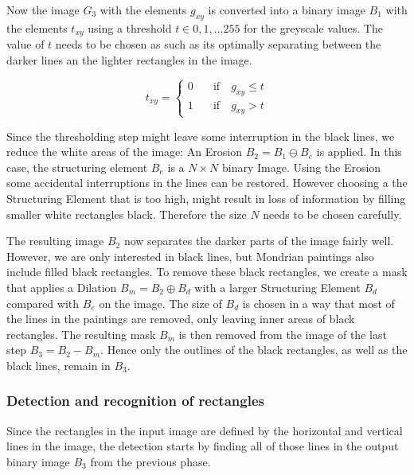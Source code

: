 Now the image $G_3$ with the elements $g_{xy}$ is converted into a binary image
$B_1$ with the elements $t_{xy}$ using a threshold $t \in 0,1,\dots255$ for the
greyscale values. The value of $t$ needs to be chosen as such as its optimally
separating between the darker lines an the lighter rectangles in the image.

\begin{equation}
  t_{xy} =
  \begin{cases}
    0 & \quad  \text{if}  \quad g_{xy} \leq t\\
    1  & \quad \text{if}  \quad g_{xy} > t
  \end{cases}
\end{equation}

Since the thresholding step might leave some interruption in the black lines, we
reduce the white areas of the image: An Erosion $B_2 = B_1 \ominus B_e$ is
applied. In this case, the structuring element $B_e$ is a $N\times N$ binary
Image. Using the Erosion some accidental interruptions in the lines can be
restored. However choosing a the Structuring Element that is too high, might
result in loss of information by filling smaller white rectangles black.
Therefore the size $N$ needs to be chosen carefully.

The resulting image $B_2$ now separates the darker parts of the image fairly
well. However, we are only interested in black lines, but Mondrian paintings
also include filled black rectangles. To remove these black rectangles, we
create a mask that applies a Dilation $B_m = B_2 \oplus B_d$ with a larger
Structuring Element $B_d$ compared with $B_e$ on the image. The size of $B_d$ is
chosen in a way that most of the lines in the paintings are removed, only
leaving inner areas of black rectangles. The resulting mask $B_m$ is then
removed from the image of the last step $B_3 = B_2 - B_m$. Hence only the
outlines of the black rectangles, as well as the black lines, remain in $B_3$.

\subsubsection{Detection and recognition of rectangles} \label{rectangles}

Since the rectangles in the input image are defined by the horizontal and
vertical lines in the image, the detection starts by finding all of those lines
in the output binary image $B_3$ from the previous phase.


